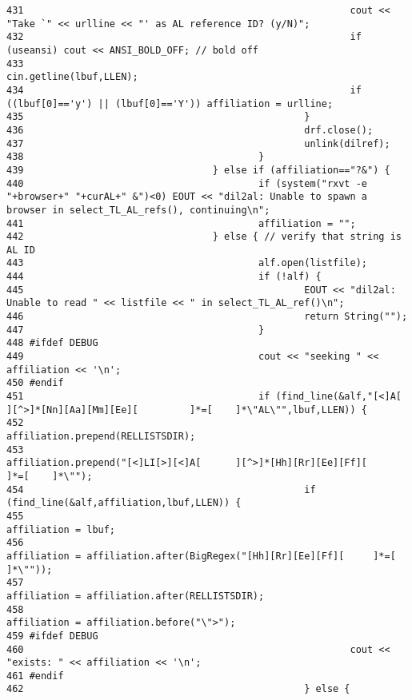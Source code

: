 \begin{verbatim}
431                                                         cout << "Take `" << urlline << "' as AL reference ID? (y/N)";
432                                                         if (useansi) cout << ANSI_BOLD_OFF; // bold off
433                                                         cin.getline(lbuf,LLEN);
434                                                         if ((lbuf[0]=='y') || (lbuf[0]=='Y')) affiliation = urlline;
435                                                 }
436                                                 drf.close();
437                                                 unlink(dilref);
438                                         }
439                                 } else if (affiliation=="?&") {
440                                         if (system("rxvt -e "+browser+" "+curAL+" &")<0) EOUT << "dil2al: Unable to spawn a browser in select_TL_AL_refs(), continuing\n";
441                                         affiliation = "";
442                                 } else { // verify that string is AL ID
443                                         alf.open(listfile);
444                                         if (!alf) {
445                                                 EOUT << "dil2al: Unable to read " << listfile << " in select_TL_AL_ref()\n";
446                                                 return String("");
447                                         }
448 #ifdef DEBUG
449                                         cout << "seeking " << affiliation << '\n';
450 #endif
451                                         if (find_line(&alf,"[<]A[       ][^>]*[Nn][Aa][Mm][Ee][         ]*=[    ]*\"AL\"",lbuf,LLEN)) {
452                                                 affiliation.prepend(RELLISTSDIR);
453                                                 affiliation.prepend("[<]LI[>][<]A[      ][^>]*[Hh][Rr][Ee][Ff][         ]*=[    ]*\"");
454                                                 if (find_line(&alf,affiliation,lbuf,LLEN)) {
455                                                         affiliation = lbuf;
456                                                         affiliation = affiliation.after(BigRegex("[Hh][Rr][Ee][Ff][     ]*=[    ]*\""));
457                                                         affiliation = affiliation.after(RELLISTSDIR);
458                                                         affiliation = affiliation.before("\">");
459 #ifdef DEBUG
460                                                         cout << "exists: " << affiliation << '\n';
461 #endif
462                                                 } else {

\end{verbatim}
